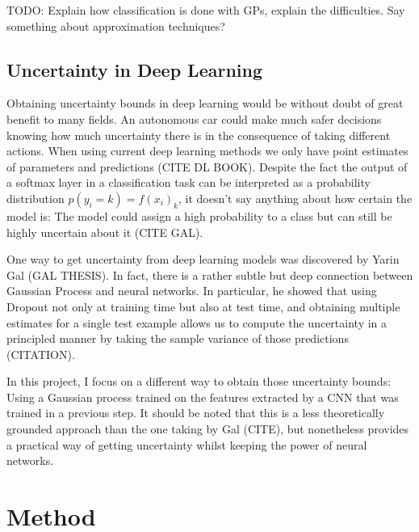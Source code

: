 \documentclass{article}
\begin{document}
TODO: Explain how classification is done with GPs, explain the difficulties. Say something about approximation techniques?

\subsection{Uncertainty in Deep Learning}
Obtaining uncertainty bounds in deep learning would be without doubt of great benefit to many fields. An autonomous car could make much safer decisions knowing how much uncertainty there is in the consequence of taking different actions. When using current deep learning methods we only have point estimates of parameters and predictions (CITE DL BOOK). Despite the fact the output of a softmax layer in a classification task can be interpreted as a probability distribution $p(y_i = k) = f(x_i)_k$, it doesn't say anything about how certain the model is: The model could assign a high probability to a class but can still be highly uncertain about it (CITE GAL). 

One way to get uncertainty from deep learning models was discovered by Yarin Gal (GAL THESIS). In fact, there is a rather subtle but deep connection between Gaussian Process and neural networks. In particular, he showed that using Dropout not only at training time but also at test time, and obtaining multiple estimates for a single test example allows us to compute the uncertainty in a principled manner by taking the sample variance of those predictions (CITATION).

In this project, I focus on a different way to obtain those uncertainty bounds: Using a Gaussian process trained on the features extracted by a CNN that was trained in a previous step. It should be noted that this is a less theoretically grounded approach than the one taking by Gal (CITE), but nonetheless provides a practical way of getting uncertainty whilst keeping the power of neural networks. 

\section{Method}
\end{document}
